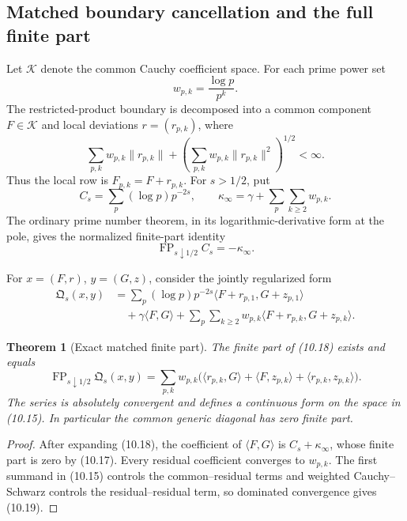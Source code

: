 \documentclass[11pt]{amsart}
\newtheorem{theorem}{Theorem}[section]
\theoremstyle{definition}
\theoremstyle{remark}
\begin{document}
\subsection{Matched boundary cancellation and the full finite part}

Let \(\mathscr K\) denote the common Cauchy coefficient space.  For each
prime power set
\[
 w_{p,k}=\frac{\log p}{p^k}.
 \tag{10.14}
\]
The restricted-product boundary is decomposed into a common component
\(F\in\mathscr K\) and local deviations \(r=(r_{p,k})\), where
\[
 \sum_{p,k}w_{p,k}\|r_{p,k}\|
 +\left(\sum_{p,k}w_{p,k}\|r_{p,k}\|^2\right)^{1/2}<\infty.
 \tag{10.15}
\]
Thus the local row is \(F_{p,k}=F+r_{p,k}\).  For \(s>1/2\), put
\[
 C_s=\sum_p(\log p)p^{-2s},
 \qquad
 \kappa_\infty=\gamma+\sum_p\sum_{k\ge2}w_{p,k}.
 \tag{10.16}
\]
The ordinary prime number theorem, in its logarithmic-derivative form at
the pole, gives the normalized finite-part identity
\[
 \operatorname{FP}_{s\downarrow1/2}C_s=-\kappa_\infty.
 \tag{10.17}
\]

For \(x=(F,r)\), \(y=(G,z)\), consider the jointly regularized form
\[
 \begin{aligned}
 \mathfrak Q_s(x,y)
 &=\sum_p(\log p)p^{-2s}
   \langle F+r_{p,1},G+z_{p,1}\rangle\\
 &\quad+\gamma\langle F,G\rangle
 +\sum_p\sum_{k\ge2}w_{p,k}
   \langle F+r_{p,k},G+z_{p,k}\rangle.
 \end{aligned}
 \tag{10.18}
\]

\begin{theorem}[Exact matched finite part]
\label{thm:matched-finite-part}
The finite part of (10.18) exists and equals
\[
 \boxed{
 \operatorname{FP}_{s\downarrow1/2}\mathfrak Q_s(x,y)
 =\sum_{p,k}w_{p,k}
 \bigl(
 \langle r_{p,k},G\rangle
 +\langle F,z_{p,k}\rangle
 +\langle r_{p,k},z_{p,k}\rangle
 \bigr).}
 \tag{10.19}
\]
The series is absolutely convergent and defines a continuous form on the
space in (10.15).  In particular the common generic diagonal has zero
finite part.
\end{theorem}

\begin{proof}
After expanding (10.18), the coefficient of \(\langle F,G\rangle\) is
\(C_s+\kappa_\infty\), whose finite part is zero by (10.17).  Every
residual coefficient converges to \(w_{p,k}\).  The first summand in
(10.15) controls the common--residual terms and weighted
Cauchy--Schwarz controls the residual--residual term, so dominated
convergence gives (10.19).
\end{proof}
\end{document}
